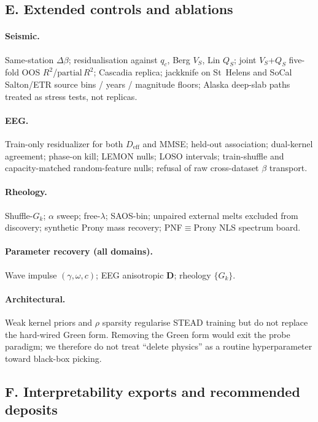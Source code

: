 \documentclass[twocolumn, 10pt]{article}
\begin{document}
\subsection*{E. Extended controls and ablations}

\paragraph{Seismic.}
Same-station \(\Delta\beta\); residualisation against \(q_c\), Berg \(V_S\), Lin \(Q_S\); joint \(V_S\)+\(Q_S\) five-fold OOS \(R^{2}\)/\(\mathrm{partial}\,R^{2}\); Cascadia replica; jackknife on St~Helens and SoCal Salton/ETR source bins / years / magnitude floors; Alaska deep-slab paths treated as stress tests, not replicas.

\paragraph{EEG.}
Train-only residualizer for both \(D_{\mathrm{eff}}\) and MMSE; held-out association; dual-kernel agreement; phase-on kill; LEMON nulls; LOSO intervals; train-shuffle and capacity-matched random-feature nulls; refusal of raw cross-dataset \(\beta\) transport.

\paragraph{Rheology.}
Shuffle-\(G_k\); \(\alpha\) sweep; free-\(\lambda\); SAOS-bin; unpaired external melts excluded from discovery; synthetic Prony mass recovery; PNF\(\equiv\)Prony NLS spectrum board.

\paragraph{Parameter recovery (all domains).}
Wave impulse \((\gamma,\omega,c)\); EEG anisotropic \(\mathbf{D}\); rheology \(\{G_k\}\).

\paragraph{Architectural.}
Weak kernel priors and \(\rho\) sparsity regularise STEAD training but do not replace the hard-wired Green form. Removing the Green form would exit the probe paradigm; we therefore do not treat ``delete physics'' as a routine hyperparameter toward black-box picking.

\subsection*{F. Interpretability exports and recommended deposits}
\end{document}
